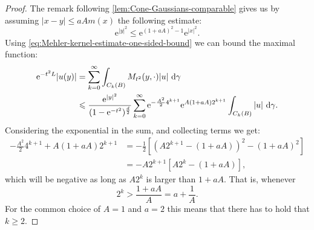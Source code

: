 \documentclass[a4paper,oneside,10pt]{amsproc}
\theoremstyle{plain}
\theoremstyle{remark}
\theoremstyle{definition}
\newcommand{\D}{\,\textup{d}}
\renewcommand{\leq}{\leqslant}
\renewcommand{\leq}{\leqslant}
\renewcommand{\geq}{\geqslant}
\newcommand{\e}{\mathrm{e}} %
\renewcommand{\leq}{\leqslant}%
\renewcommand{\geq}{\geqslant}%
\begin{document}
\begin{proof}
  The remark following \autoref{lem:Cone-Gaussians-comparable}
  gives us by assuming $|x - y| \leq aA m(x)$ the following estimate:
  \begin{equation*}
    \e^{|y|^2} \leq \e^{(1 + aA)^2 - 1} \e^{|x|^2}.
  \end{equation*}
  Using \eqref{eq:Mehler-kernel-estimate-one-sided-bound} we can bound
  the maximal function:
  \begin{equation}
    \label{eq:Maximal-function-cone-intermediate-step-1}
    \begin{split}
      \e^{-t^2 L} |u(y)| &= \sum_{k = 0}^\infty \int_{C_k(B)} M_{t^2}(y,
      \cdot) |u| \,\D\gamma\\
      &\leq \frac{\e^{|y|^2}}{(1 - \e^{-t^2})^{\frac{d}2}} \sum_{k = 0}^\infty
      \e^{-\frac{A^2}2 4^{k + 1}} \e^{A(1 + aA) 2^{k + 1}} \int_{C_k(B)}  |u| \,\D\gamma.
    \end{split}
  \end{equation}
  Considering the exponential in the sum, and collecting terms we get:
  \begin{align*}
    -\frac{A^2}2 4^{k + 1} + A(1 + aA) 2^{k + 1} &= -\frac12 [(A 2^{k +
      1} - (1 + a A))^2 - (1 + aA)^2]\\
    &= -A 2^{k+1} [A 2^k -(1 + a A)],
  \end{align*}
  which will be negative as long as $A 2^k$ is larger than $1 + aA$.
  That is, whenever
  \begin{equation*}
    2^k > \frac{1 + a A}{A} = a + \frac1A.
  \end{equation*}
  For the common choice of $A = 1$ and $a = 2$ this means that there
  has to hold that $k \geq 2$.


\end{proof}
\end{document}
